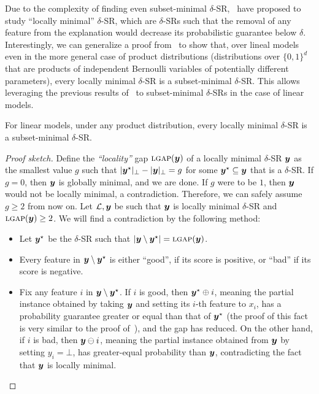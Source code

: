 Due to the complexity of finding even subset-minimal $\delta$-SR,~\citet{izza2024locallyminimalprobabilisticexplanations} have proposed to study ``locally minimal'' $\delta$-SR, which are $\delta$-SRs such that the removal of any feature from the explanation would decrease its probabilistic guarantee below $\delta$.
Interestingly, we can generalize a proof from~\cite{NEURIPS2022_b8963f6a} to show that, over lineal models even in the more general case of product distributions (distributions over $\{0,1\}^d$ that are products of independent Bernoulli variables of potentially different parameters), every locally minimal $\delta$-SR is a subset-minimal $\delta$-SR. This allows leveraging the previous results of~\citet{izza2024locallyminimalprobabilisticexplanations} to subset-minimal $\delta$-SRs in the case of linear models.


\begin{theorem}\label{thm:locally-minimal}
For linear models, under any product distribution, every locally minimal $\delta$-SR is a subset-minimal $\delta$-SR.
\end{theorem}
\begin{proof}[Proof sketch]
    Define the \emph{``locality''} gap $\textsc{lgap}({\bm{y}})$ of a locally minimal $\delta$-SR ${\bm{y}}$ as the smallest value $g$ such that $|{\bm{y}}^\star|_\bot - |{\bm{y}}|_\bot = g$ for some ${\bm{y}}^\star \subseteq {\bm{y}}$ that is a $\delta$-SR.
    If $g = 0$, then ${\bm{y}}$ is globally minimal, and we are done. If $g$ were to be $1$, then ${\bm{y}}$ would not be locally minimal, a contradiction. Therefore, we can safely assume $g \geq 2$ from now on.
    Let $\mathcal{L}, {\bm{y}}$ be such that ${\bm{y}}$ is locally minimal $\delta$-SR and $\textsc{lgap}({\bm{y}}) \geq 2$. We will find a contradiction by the following method:
    \begin{itemize}
        \item Let ${\bm{y}}^\star$ be the $\delta$-SR such that $| {\bm{y}} \setminus {\bm{y}}^\star | = \textsc{lgap}({\bm{y}})$.
        \item Every feature in ${\bm{y}} \setminus {\bm{y}}^\star$ is either ``good'', if its score is positive, or ``bad'' if its score is negative.
        \item Fix any feature $i$ in ${\bm{y}} \setminus {\bm{y}}^\star$. If $i$ is good, then ${\bm{y}}^\star \oplus i$, meaning the partial instance obtained by taking ${\bm{y}}$ and setting its $i$-th feature to $x_i$, has a probability guarantee greater or equal than that of ${\bm{y}}^\star$ (the proof of this fact is very similar to the proof of~), and the gap has reduced.
                On the other hand, if $i$ is bad, then ${\bm{y}} \ominus i$, meaning the partial instance obtained from ${\bm{y}}$ by setting $y_i = \bot$, has greater-equal probability than ${\bm{y}}$, contradicting the fact that ${\bm{y}}$ is locally minimal.
    \end{itemize}


\end{proof}
